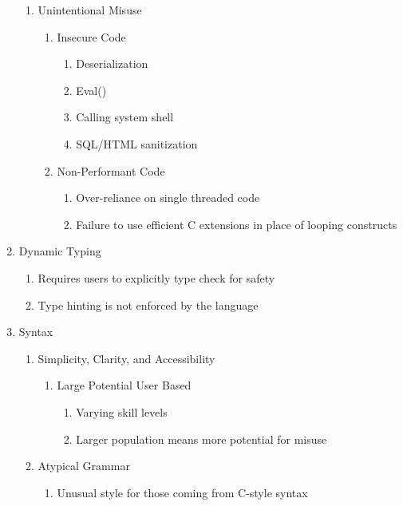 \begin{enumerate}
\begin{enumerate}
                \item Unintentional Misuse
                \begin{enumerate}
                        \item Insecure Code
                        \begin{enumerate}
                                \item Deserialization
                                \item Eval()
                                \item Calling system shell
                                \item SQL/HTML sanitization
                        \end{enumerate}
                        \item Non-Performant Code
                        \begin{enumerate}
                                \item Over-reliance on single threaded code
                                \item Failure to use efficient C extensions in place of looping constructs
                        \end{enumerate}
                \end{enumerate}
        \end{enumerate} %

        \item Dynamic Typing
        \begin{enumerate}
                \item Requires users to explicitly type check for safety
                \item Type hinting is not enforced by the language
        \end{enumerate}           

        \item Syntax
        \begin{enumerate}
                \item Simplicity, Clarity, and Accessibility
                \begin{enumerate}
                        \item Large Potential User Based
                        \begin{enumerate}
                                \item Varying skill levels
                                \item Larger population means more potential for misuse
                        \end{enumerate}
                \end{enumerate}
                \item Atypical Grammar
                \begin{enumerate}
                        \item Unusual style for those coming from C-style syntax
                \end{enumerate}
        \end{enumerate} %


\end{enumerate}
